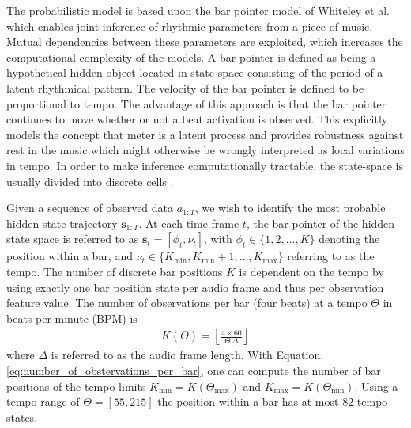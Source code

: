 \documentclass{scrartcl}
\begin{document}
The probabilistic model is based upon the bar pointer model of Whiteley et al. \cite{Whiteley2006} which enables joint inference of rhythmic parameters from a piece of music. Mutual dependencies between these parameters are exploited, which increases the computational complexity of the models. A bar pointer is defined as being a hypothetical hidden object located in state space consisting of the period of a latent rhythmical pattern. The velocity of the bar pointer is defined to be proportional to tempo. The advantage of this approach is that the bar pointer continues to move whether or not a beat activation is observed. This explicitly models the concept that meter is a latent process and provides robustness against rest in the music which might otherwise be wrongly interpreted as local variations in tempo. In order to make inference computationally tractable, the state-space is usually divided into discrete cells \cite{Krebs2015}. 

Given a sequence of observed data $a_{1:T}$, we wish to identify the most probable hidden state trajectory $\mathbf s_{1:T}$. At each time frame $t$, the bar pointer of the hidden state space is referred to as $\mathbf s_t = [\phi_t, \nu_t]$, with $\phi_t \in \{1, 2, \dots, K\}$ denoting the position within a bar, and $\nu_t \in \{ K_{\text{min}}, K_{\text{min}}+1, \dots, K_{\text{max}}\}$ referring to as the tempo. The number of discrete bar positions $K$ is dependent on the tempo by using exactly one bar position state per audio frame and thus per observation feature value. The number of observations per bar (four beats) at a tempo $\Theta$ in beats per minute (BPM) is
\begin{align}
K(\Theta) = \left\lfloor \frac{4 \times 60}{\Theta \, \Delta} \right\rfloor 
\label{eq:number_of_obstervations_per_bar}
\end{align} 
where $\Delta$ is referred to as the audio frame length. With Equation. \ref{eq:number_of_obstervations_per_bar}, one can compute the number of bar positions of the tempo limits $K_\text{min} = K(\Theta_\text{max})$ and $K_\text{max} =K(\Theta_\text{min})$. Using a tempo range of  $\Theta = [55, 215]$ the position within a bar has at most $82$ tempo states.
\end{document}
